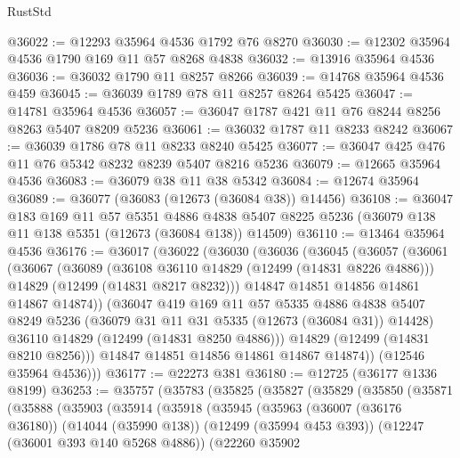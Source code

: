 \begin{lexlean}{RustStd}
\begin{coremodule}
@36022 := @12293 @35964 @4536 @1792 @76 @8270
@36030 := @12302 @35964 @4536 @1790 @169 @11 @57 @8268 @4838
@36032 := @13916 @35964 @4536
@36036 := @36032 @1790 @11 @8257 @8266
@36039 := @14768 @35964 @4536 @459
@36045 := @36039 @1789 @78 @11 @8257 @8264 @5425
@36047 := @14781 @35964 @4536
@36057 := @36047 @1787 @421 @11 @76 @8244 @8256 @8263 @5407 @8209 @5236
@36061 := @36032 @1787 @11 @8233 @8242
@36067 := @36039 @1786 @78 @11 @8233 @8240 @5425
@36077 := @36047 @425 @476 @11 @76 @5342 @8232 @8239 @5407 @8216 @5236
@36079 := @12665 @35964 @4536
@36083 := @36079 @38 @11 @38 @5342
@36084 := @12674 @35964
@36089 := @36077 (@36083 (@12673 (@36084 @38)) @14456)
@36108 := @36047
    @183
    @169
    @11
    @57
    @5351
    @4886
    @4838
    @5407
    @8225
    @5236
    (@36079 @138 @11 @138 @5351 (@12673 (@36084 @138)) @14509)
@36110 := @13464 @35964 @4536
@36176 := @36017
    (@36022
      (@36030
        (@36036
          (@36045
            (@36057
              (@36061
                (@36067
                  (@36089
                    (@36108 @36110 @14829 (@12499 (@14831 @8226 @4886)))
                    @14829
                    (@12499 (@14831 @8217 @8232)))
                  @14847
                  @14851
                  @14856
                  @14861
                  @14867
                  @14874))
              (@36047
                @419
                @169
                @11
                @57
                @5335
                @4886
                @4838
                @5407
                @8249
                @5236
                (@36079 @31 @11 @31 @5335 (@12673 (@36084 @31)) @14428)
                @36110
                @14829
                (@12499 (@14831 @8250 @4886)))
              @14829
              (@12499 (@14831 @8210 @8256)))
            @14847
            @14851
            @14856
            @14861
            @14867
            @14874))
        (@12546 @35964 @4536)))
@36177 := @22273 @381
@36180 := @12725 (@36177 @1336 @8199)
@36253 := @35757
    (@35783
      (@35825
        (@35827
          (@35829
            (@35850
              (@35871
                (@35888
                  (@35903
                    (@35914
                      (@35918
                        (@35945
                          (@35963
                            (@36007 (@36176 @36180))
                            (@14044 (@35990 @138))
                            (@12499 (@35994 @453 @393))
                            (@12247 (@36001 @393 @140 @5268 @4886))
                            (@22260
                              @35902

\end{coremodule}
\end{lexlean}
